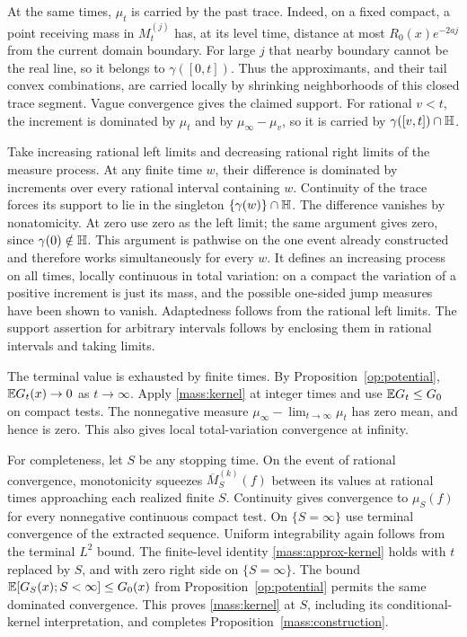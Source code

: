At the same times, $\mu_t$ is carried by the past trace.  Indeed, on a
fixed compact, a point receiving mass in $M_t^{(j)}$ has, at its level
time, distance at most $R_0(x)e^{-2aj}$ from the current domain boundary.
For large $j$ that nearby boundary cannot be the real line, so it belongs
to $\gamma([0,t])$.  Thus the approximants, and their tail convex
combinations, are carried locally by shrinking neighborhoods of this
closed trace segment.  Vague convergence gives the claimed support.
For rational $v<t$, the increment is dominated by $\mu_t$ and by
$\mu_\infty-\mu_v$, so it is carried by $\gamma([v,t])\cap\mathbb H$.

Take increasing rational left limits and decreasing rational right limits
of the measure process.  At any finite time $w$, their difference is
dominated by increments over every rational interval containing $w$.
Continuity of the trace forces its support to lie in the singleton
$\{\gamma(w)\}\cap\mathbb H$.  The difference vanishes by nonatomicity.
At zero use zero as the left limit; the same argument gives zero, since
$\gamma(0)\notin\mathbb H$.  This argument is pathwise on the one event already
constructed and therefore works simultaneously for every $w$.
It defines an increasing process on all times, locally continuous in total
variation: on a compact the variation of a positive increment is just its
mass, and the possible one-sided jump measures have been shown to vanish.
Adaptedness follows from the rational left limits.
The support assertion for arbitrary intervals follows by enclosing them
in rational intervals and taking limits.

The terminal value is exhausted by finite times.  By
Proposition~\ref{op:potential}, $\mathbb E G_t(x)\to0$ as $t\to\infty$.
Apply \eqref{mass:kernel} at integer times and use
$\mathbb E G_t\le G_0$ on compact tests.  The nonnegative measure
$\mu_\infty-\lim_{t\to\infty}\mu_t$ has zero mean, and hence is zero.
This also gives local total-variation convergence at infinity.

For completeness, let $S$ be any stopping time.  On the event of rational
convergence, monotonicity squeezes $\overline M_S^{(k)}(f)$ between its
values at rational times approaching each realized finite $S$.
Continuity gives convergence to $\mu_S(f)$ for every nonnegative
continuous compact test.  On $\{S=\infty\}$ use terminal convergence of
the extracted sequence.  Uniform integrability again follows from the
terminal $L^2$ bound.  The finite-level identity
\eqref{mass:approx-kernel} holds with $t$ replaced by $S$, and with zero
right side on $\{S=\infty\}$.  The bound
$\mathbb E[G_S(x);S<\infty]\le G_0(x)$ from
Proposition~\ref{op:potential} permits the same dominated convergence.
This proves \eqref{mass:kernel} at $S$, including its conditional-kernel
interpretation, and completes Proposition~\ref{mass:construction}.

